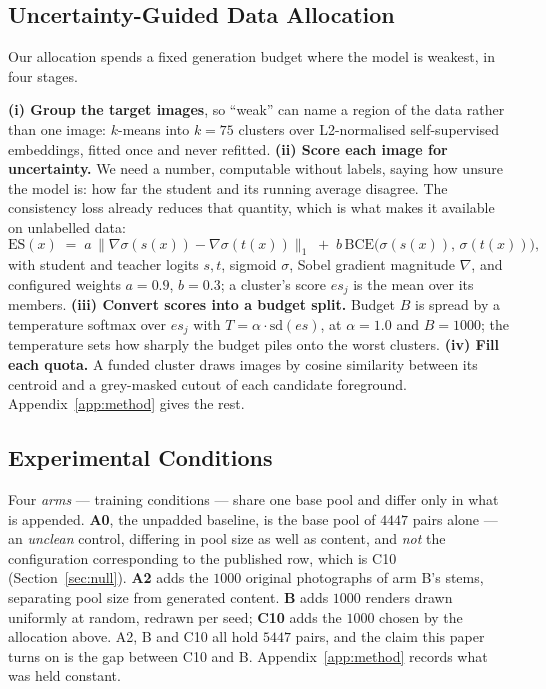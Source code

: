 \documentclass{article} %
\begin{document}
\subsection{Uncertainty-Guided Data Allocation}
\label{sec:method-allocation}

Our allocation spends a fixed generation budget where the model is weakest, in four stages.

\textbf{(i) Group the target images}, so ``weak'' can name a region of the data rather than one
image: $k$-means into $k=75$ clusters over L2-normalised self-supervised embeddings, fitted once and
never refitted. \textbf{(ii) Score each image for uncertainty.} We need a number, computable without
labels, saying how unsure the model is: how far the student and its running average disagree. The
consistency loss already reduces that quantity, which is what makes it available on unlabelled
data:
\begin{equation}
\mathrm{ES}(x) \;=\; a \,\big\| \nabla \sigma(s(x)) - \nabla \sigma(t(x)) \big\|_{1}
\;+\; b \, \mathrm{BCE}\big( \sigma(s(x)),\, \sigma(t(x)) \big),
\label{eq:es}
\end{equation}
with student and teacher logits $s,t$, sigmoid $\sigma$, Sobel gradient magnitude $\nabla$, and
configured weights $a=0.9$, $b=0.3$; a cluster's score $\mathit{es}_j$ is the mean over its
members. \textbf{(iii) Convert scores into a budget split.} Budget $B$ is spread by a temperature
softmax over $\mathit{es}_j$ with $T = \alpha \cdot \mathrm{sd}(\mathit{es})$, at $\alpha = 1.0$ and
$B = 1000$; the temperature sets how sharply the budget piles onto the worst clusters.
\textbf{(iv) Fill each quota.} A funded cluster draws images by cosine similarity between its
centroid and a grey-masked cutout of each candidate foreground. Appendix~\ref{app:method} gives the
rest.

\subsection{Experimental Conditions}
\label{sec:method-arms}

Four \emph{arms} --- training conditions --- share one base pool and differ only in what is
appended. \textbf{A0}, the unpadded baseline, is the base pool of $4447$ pairs alone --- an
\emph{unclean} control, differing in pool size as well as content, and \emph{not} the configuration
corresponding to the published row, which is C10 (Section~\ref{sec:null}). \textbf{A2} adds the $1000$ original photographs of arm B's stems, separating pool size from
generated content. \textbf{B} adds $1000$ renders drawn uniformly at random, redrawn per seed;
\textbf{C10} adds the $1000$ chosen by the allocation above. A2, B and C10 all hold $5447$ pairs, and the claim this paper
turns on is the gap between C10 and B. Appendix~\ref{app:method} records what was held constant.
\end{document}
